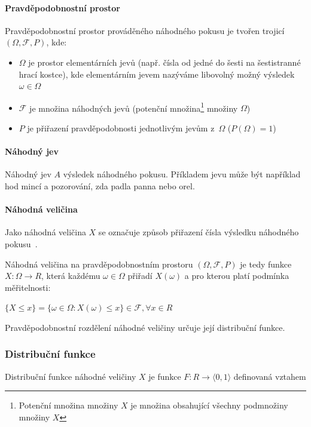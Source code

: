 \documentclass[thesis=M,czech]{FITthesis}[2014/05/07]
\begin{document}
\paragraph{Pravděpodobnostní prostor}

Pravděpodobnostní prostor prováděného náhodného pokusu je tvořen trojicí $(\Omega,\mathcal{F},P)$, kde:
	\begin{itemize}
		\item $\Omega$ je prostor elementárních jevů (např. čísla od jedné do šesti na šestistranné hrací kostce), kde elementárním jevem nazýváme libovolný možný výsledek $\omega \in \Omega$ 
		\item $\mathcal{F}$ je množina náhodných jevů (potenční množina\footnote{Potenční množina množiny $X$ je množina obsahující všechny podmnožiny množiny $X$} množiny $\Omega$)
		\item $P$ je přiřazení pravděpodobnosti jednotlivým jevům z~$\Omega$ ($P(\Omega)=1$)
	\end{itemize}

\paragraph{Náhodný jev}
	
Náhodný jev $A$ výsledek náhodného pokusu. Příkladem jevu může být například hod mincí a pozorování, zda padla panna nebo orel.

\paragraph{Náhodná veličina}
	\label{randomvel}
Jako náhodná veličina $X$ se označuje způsob přiřazení čísla výsledku náhodného pokusu~\cite{pst1}. 

Náhodná veličina na pravděpodobnostním prostoru $(\Omega,\mathcal{F},P)$ je tedy funkce $X: \Omega \to R$, která každému $\omega \in \Omega$ přiřadí $X(\omega)$ a pro kterou platí podmínka měřitelnosti:

\begin{center}
$\{ X \leq x \} = \{ \omega \in \Omega: X(\omega) \leq x \} \in \mathcal{F}, \forall x \in R$
\end{center}

Pravděpodobnostní rozdělení náhodné veličiny určuje její distribuční funkce. 

\subsubsection{Distribuční funkce}
\label{cdf}
Distribuční funkce náhodné veličiny $X$ je funkce $F: R \to \langle0,1\rangle$ definovaná vztahem 
\end{document}
